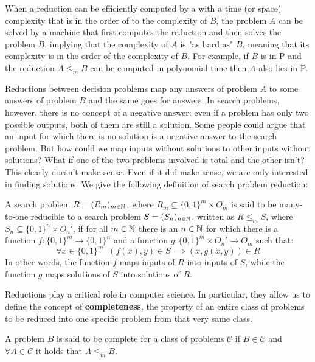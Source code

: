 When a reduction can be efficiently computed by a \TM with a time (or space) complexity that is in the order of to the complexity of $B$, the problem $A$ can be solved by a machine that first computes the reduction and then solves the problem $B$, implying that the complexity of $A$ is "as hard as" $B$, meaning that its complexity is in the order of the complexity of $B$. For example, if $B$ is in \textsf{P} and the reduction $A \leq_m B$ can be computed in polynomial time then $A$ also lies in \textsf{P}.

Reductions between decision problems map any  answers of problem $A$ to some  answers of problem $B$ and the same goes for  answers. In search problems, however, there is no concept of a negative answer: even if a problem has only two possible outputs, both of them are still a solution. Some people could argue that an input for which there is no solution is a negative answer to the search problem. But how could we map inputs without solutions to other inputs without solutions? What if one of the two problems involved is total and the other isn't? This clearly doesn't make sense. Even if it did make sense, we are only interested in finding solutions. We give the following definition of search problem reduction:

\begin{definition}
 A search problem $R = (R_m)_{m \in \mathbb{N}}$, where $R_m \subseteq \{0,1\}^m \times O_m$ is said to be many-to-one reducible to a search problem $S = (S_n)_{n \in \mathbb{N}}$, written as $R \leq_m S$, where $S_n \subseteq \{0,1\}^n \times O_n'$, if for all $m \in \mathbb{N}$ there is an $n \in \mathbb{N}$ for which there is a function $f : \{0,1\}^m \to \{0,1\}^n$ and a function $g : \{0,1\}^m \times O_n' \to O_m$ such that:
    \[\forall x \in \{0,1\}^m \;\; (f(x), y) \in S \implies (x, g(x,y)) \in R\]
 In other words, the function $f$ maps inputs of $R$ into inputs of $S$, while the function $g$ maps solutions of $S$ into solutions of $R$. 
\end{definition}

\newpage

Reductions play a critical role in computer science. In particular, they allow us to define the concept of \textbf{completeness}, the property of an entire class of problems to be reduced into one specific problem from that very same class.

\begin{definition}
 A problem $B$ is said to be complete for a class of problems $\mathcal{C}$ if $B \in \mathcal{C}$ and $\forall A \in \mathcal{C}$ it holds that $A \leq_m B$.
\end{definition}

